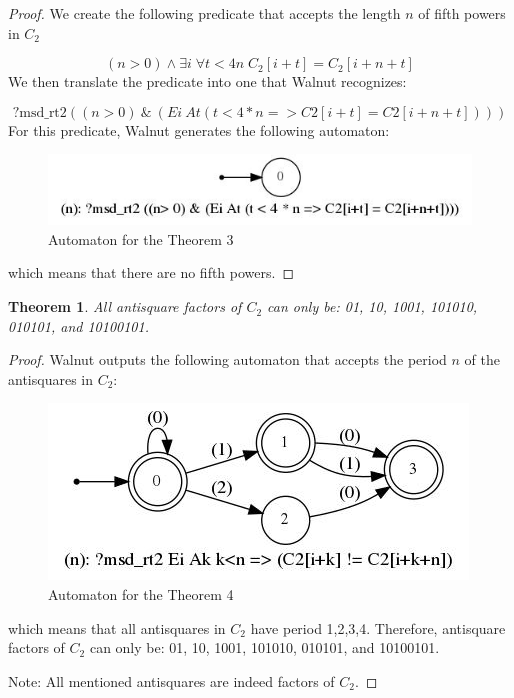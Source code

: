 \documentclass[a4paper]{article}
\newtheorem{theorem}{Theorem}
\begin{document}
\begin{proof}
We create the following predicate that accepts the length $n$ of fifth powers in $C_2$

$$(n > 0) \land \exists i \; \forall t<4n \;C_2[i+t] = C_2[i+n+t]$$
We then translate the predicate into one that Walnut recognizes:

$$ ? \text{msd}\_\text{rt2} ((n>0)~\&~(Ei~At (t<4 \ast n => C2[i+t] = C2[i+n+t])))$$
For this predicate, Walnut generates the following automaton:

\begin{figure}[h]
\centering
\includegraphics[width=0.7\columnwidth]{theorem5_1_gv.jpg}
    \caption{Automaton for the Theorem 3}
    \label{fig:Theorem}
\end{figure}
which means that there are no fifth powers.
\end{proof}

\begin{theorem}  All antisquare factors of \textbf{$C_2$} can only be: 01, 10, 1001, 101010, 010101, and 10100101.
\end{theorem}

\begin{proof}
Walnut outputs the following automaton that accepts the period $n$ of the antisquares in $C_2$:

\begin{figure}[h]
\centering
\includegraphics[width=0.7\columnwidth]{theorem11_gv.jpg}
    \caption{Automaton for the Theorem 4} 
    \label{fig:Theorem}
\end{figure}
which means that all antisquares in $C_2$ have period 1,2,3,4. Therefore, antisquare factors of $C_2$ can only be: 01, 10, 1001, 101010, 010101, and 10100101.

Note: All mentioned antisquares are indeed factors of $C_2$.
\end{proof}
\end{document}
